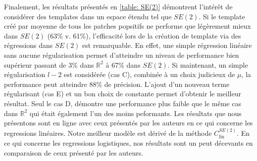 \documentclass{article}
\begin{document}
Finalement, les résultats présentés en \ref{table: SE(2)} démontrent l'intérêt de considérer des templates dans un espace étendu tel que $SE(2)$.
Si le template créé par moyenne de tous les patches popsitifs ne performe que légèrement mieux dans $SE(2)$ (63\% v. 61\%), l'efficacité 
lors de la création de template via des régressions dans $SE(2)$ est remarquable. En effet, une simple régression linéaire sans aucune régularisation permet 
d'atteindre un niveau de performance bien supérieur passant de 3\% dans $\mathbb{R}^2$ à 67\% dans $SE(2)$. Si maintenant, 
un simple régularisation $l-2$ est considérée (cas C), combinée à un choix judicieux de $\mu$,  la performance peut atteindre 88\% de précision.
L'ajout d'un nouveau terme régularisant (cas E) et un bon choix de constante permet d'obtenir le meilleur résultat. Seul le cas D, démontre une 
performance plus faible que le même cas dans $\mathbb{R}^2$ qui était également l'un des moins peformants. Les résultats que nous présentons sont en ligne avec ceux 
présentés par les auteurs en ce qui concerne les regressions linéaires. Notre meilleur modèle est dérivé de la méthode $C_{\text{lin}}^{SE(2)}$. En ce qui concerne 
les regressions logistiques, nos résultats sont un peut décevants en comparaison de ceux présenté par les auteurs. 
\end{document}
